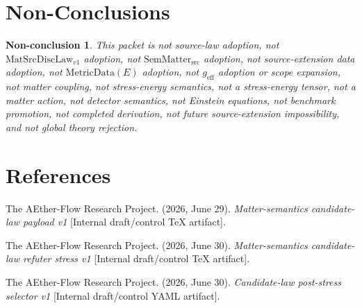 \documentclass[11pt]{article}
\newcommand{\MetricData}{\mathrm{MetricData}}
\newcommand{\geff}{g_{\mathrm{eff}}}
\newcommand{\MatSrcDiscLaw}{\mathrm{MatSrcDiscLaw}_{v1}}
\newcommand{\SemMatterSrc}{\mathrm{SemMatter}_{\mathrm{src}}}
\newtheorem{nonconclusion}{Non-conclusion}
\begin{document}
\section{Non-Conclusions}

\begin{nonconclusion}
This packet is not source-law adoption, not \(\MatSrcDiscLaw\) adoption, not
\(\SemMatterSrc\) adoption, not source-extension data adoption, not
\(\MetricData(E)\) adoption, not \(\geff\) adoption or scope expansion, not
matter coupling, not stress-energy semantics, not a stress-energy tensor, not
a matter action, not detector semantics, not Einstein equations, not benchmark
promotion, not completed derivation, not future source-extension
impossibility, and not global theory rejection.
\end{nonconclusion}

\section*{References}

The AEther-Flow Research Project. (2026, June 29). \emph{Matter-semantics
candidate-law payload v1} [Internal draft/control TeX artifact].

The AEther-Flow Research Project. (2026, June 30). \emph{Matter-semantics
candidate-law refuter stress v1} [Internal draft/control TeX artifact].

The AEther-Flow Research Project. (2026, June 30). \emph{Candidate-law
post-stress selector v1} [Internal draft/control YAML artifact].
\end{document}
